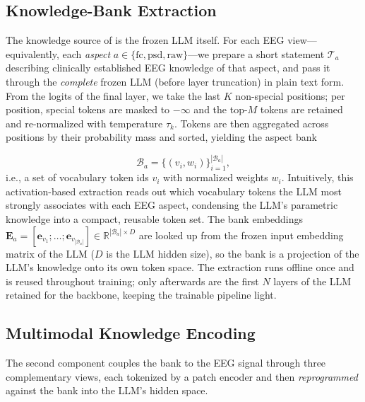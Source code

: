\subsection{Knowledge-Bank Extraction}
\label{sec:method-bank}

The knowledge source of \modelname is the frozen LLM itself. For each EEG
view---equivalently, each \emph{aspect} $a \in \{\mathrm{fc}, \mathrm{psd},
\mathrm{raw}\}$---we prepare a short statement $\mathcal{T}_a$ describing
clinically established EEG knowledge of that aspect, and pass it through the
\emph{complete} frozen LLM (before layer truncation) in plain text form. From
the logits of the final layer, we take the last $K$ non-special positions;
per position, special tokens are masked to $-\infty$ and the top-$M$ tokens
are retained and re-normalized with temperature $\tau_k$. Tokens are then
aggregated across positions by their probability mass and sorted, yielding
the aspect bank

\begin{equation}
  \mathcal{B}_a = \big\{ (v_i, w_i) \big\}_{i=1}^{|\mathcal{B}_a|},
\end{equation}
i.e., a set of vocabulary token ids $v_i$ with normalized weights $w_i$.
Intuitively, this activation-based extraction reads out which vocabulary
tokens the LLM most strongly associates with each EEG aspect, condensing the
LLM's parametric knowledge into a compact, reusable token set. The bank
embeddings
$\mathbf{E}_a = [\mathbf{e}_{v_1}; \dots; \mathbf{e}_{v_{|\mathcal{B}_a|}}]
\in \mathbb{R}^{|\mathcal{B}_a| \times D}$
are looked up from the frozen input embedding matrix of the LLM ($D$ is the
LLM hidden size), so the bank is a projection of the LLM's knowledge onto its
own token space. The extraction runs offline once and is reused throughout
training; only afterwards are the first $N$ layers of the LLM retained for
the backbone, keeping the trainable pipeline light.

\subsection{Multimodal Knowledge Encoding}
\label{sec:method-encoding}

The second component couples the bank to the EEG signal through three
complementary views, each tokenized by a patch encoder and then
\emph{reprogrammed} against the bank into the LLM's hidden space.

